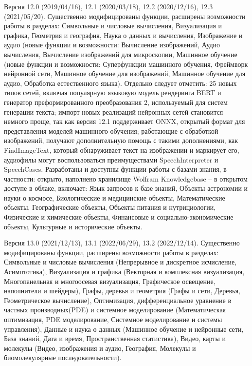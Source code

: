 \begin{textitemize}
	\item Версия 12.0 (2019/04/16), 12.1 (2020/03/18), 12.2 (2020/12/16), 12.3 (2021/05/20). Существенно модифицированы функции, расширены возможности работы в разделах: Символьные и числовые вычисления, Визуализация и графика, Геометрия и география, Наука о данных и вычисления, Изображение и аудио (новые функции и возможности: Вычисление изображений, Аудио вычисления, Вычисление изображений для микроскопии, Машинное обучение (новые функции и возможности: Суперфункции машинного обучения, Фреймворк нейронной сети, Машинное обучение для изображений, Машинное обучение для аудио, Обработка естественного языка). Отдельно следует отметить: 25 новых типов сетей, включая популярную языковую модель рендеринга BERT и генератор преформированного преобразования 2, используемый для систем генерации текста; импорт новых реализаций нейронных сетей становится немного проще, так как версия 12.1 поддерживает ONNX, открытый формат для представления моделей машинного обучения; работающие с обработкой изображений, получают дополнительную помощь с такими дополнениями, как FindImageText, который обнаруживает текст на изображении и маркирует его, аудиофилы могут воспользоваться преимуществами SpeechInterpreter и SpeechCases. Разработаны и доступны функции работы с базами знания, в частности: открыто, наполнено хранилище Wolfram Knowledgebase -- в открытом доступе в облаке, включает: Язык запросов к базе знаний, Объекты астрономии и науки о космосе, Биологические и медицинские объекты, Математические объекты, Географические объекты, Объекты питания и нутрициологии, Физические и химические объекты, Финансовые и социально-экономические объекты, Культурные и исторические объекты.
	\item Версия 13.0 (2021/12/13), 13.1 (2022/06/29), 13.2 (2022/12/14). Существенно модифицированы функции, расширены возможности работы в разделах: Символьные и числовые вычисления (Непрерывное и дискретное исчисление, Асимптотика), Визуализация и графика (Векторная и комплексная визуализация, Многопанельная и многоосевая визуализация, Графическое освещение, наполнители и шейдеры), Графы, деревья и геометрия (Графы и сети, Деревья, Геометрическое вычисление), Оптимизация, дифференциальное уравнение в частных производных(PDE) и системное моделирование (Математическая оптимизация, PDE моделирование, Системное моделирование и системы управления), Данные и наука о данных (Машинное обучение и нейронные сети, База знаний, Дата и время, Пространственная статистика), Видео, карты и молекулы (Видео, изображения и аудио, География, Молекулы и биомолекулярные последовательности). 
\end{textitemize}

